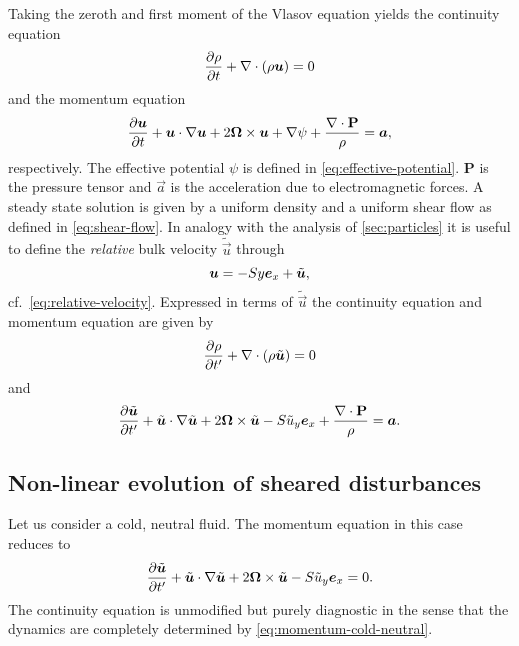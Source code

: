 \documentclass[aps,pre,notitlepage,amsmath,amssymb,amsfonts,nobibnotes,nofootinbib,superscriptaddress,onecolumn,a4paper,10pt]{revtex4-1}
\newcommand{\tvec}[1]{\tilde{\vec{#1}}}
\begin{document}
Taking the zeroth and first moment of the Vlasov equation yields the
continuity equation
\begin{equation}
  \frac{\partial\rho}{\partial t} + \nabla\cdot(\rho\bm{u}) = 0
\end{equation}
and the momentum equation
\begin{equation}
  \frac{\partial\bm{u}}{\partial t} + \bm{u}\cdot\nabla\bm{u}
  + 2\bm{\Omega}\times\bm{u} + \nabla\psi
  + \frac{\nabla\cdot\mathbf{P}}{\rho} = \bm{a},
\end{equation}
respectively. The effective potential $\psi$ is defined in
\cref{eq:effective-potential}. $\mathbf{P}$ is the pressure tensor and
$\vec{a}$ is the acceleration due to electromagnetic forces. A steady state
solution is given by a uniform density and a uniform shear flow as defined in
\cref{eq:shear-flow}. In analogy with the analysis of \cref{sec:particles} it
is useful to define the \emph{relative} bulk velocity $\tvec{u}$ through
\begin{equation}
  \vec{u} = -Sy\ex + \tvec{u},
\end{equation}
cf.~\cref{eq:relative-velocity}. Expressed in terms of $\tvec{u}$ the
continuity equation and momentum equation are given by
\begin{equation}
  \label{eq:continuity}
  \pder{\rho}{t'} + \nabla\cdot(\rho\tvec{u}) = 0
\end{equation}
and
\begin{equation}
  \label{eq:momentum}
  \pder{\tvec{u}}{t'} + \tvec{u}\cdot\nabla\tvec{u}
  + 2\vec{\Omega}\times\tvec{u} - S\tilde{u}_y\ex
  + \frac{\nabla\cdot\mathbf{P}}{\rho} = \vec{a}.
\end{equation}

\subsection{Non-linear evolution of sheared disturbances}

Let us consider a cold, neutral fluid. The momentum equation in this case
reduces to
\begin{equation}
  \label{eq:momentum-cold-neutral}
  \pder{\tvec{u}}{t'} + \tvec{u}\cdot\nabla\tvec{u}
  + 2\vec{\Omega}\times\tvec{u} - S\tilde{u}_y\ex = 0.
\end{equation}
The continuity equation  is unmodified but purely
diagnostic in the sense that the dynamics are completely determined by
\cref{eq:momentum-cold-neutral}.
\end{document}
